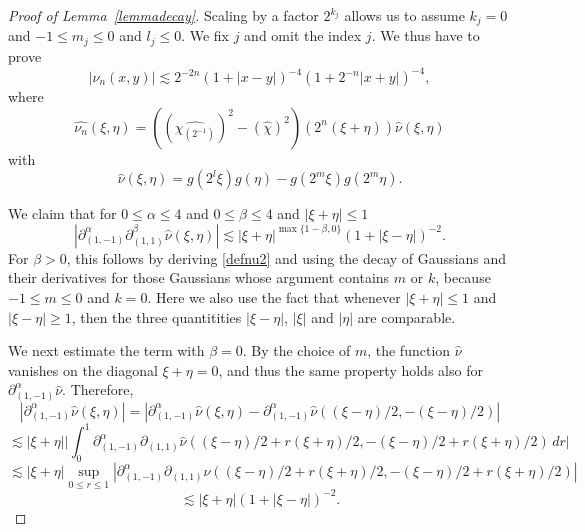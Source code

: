 \documentclass[12pt,reqno]{amsart}
\theoremstyle{plain}
\theoremstyle{definition}
\numberwithin{equation}{section}
\begin{document}
\begin{proof}[Proof of Lemma~\ref{lemmadecay}]
Scaling by a factor $2^{k_j}$ allows us to assume
$k_j=0$ and  $-1\le m_j\le 0$ and $l_j\le 0$.
We fix $j$ and omit the index $j$.   We thus have to prove
\begin{equation}\label{toprovenun2}
|\nu_{n}(x,y)|\lesssim 2^{-2n} (1+|x-y|)^{-4}(1+2^{-n} |x+y|)^{-4}, 
\end{equation}
where
\begin{equation}\label{defnun2}
\widehat{\nu_{n}}(\xi,\eta)=
((\widehat{\chi_{( 2^{-1})}})^2-(\widehat{\chi})^2)(2^{n}(\xi+\eta))\widehat{\nu}(\xi,\eta)
\end{equation}
with
\begin{equation}\label{defnu2}
\widehat{\nu}(\xi,\eta)= g(2^l\xi) g(\eta)- g(2^{m}\xi)g(2^{m}\eta).
\end{equation}

We claim that for $0\le \alpha\le 4$ and $0\le \beta\le 4$ 
and $|\xi+\eta|\le 1$
 \[|\partial_{(1,-1)}^\alpha \partial_{(1,1)}^\beta \widehat{\nu}(\xi,\eta)|
 \lesssim |\xi+\eta|^{\max\{1-\beta,0\}} (1+|\xi-\eta|)^{-2}.\]
For $\beta>0$, this follows by deriving \eqref{defnu2} 
and using the decay of Gaussians and their derivatives
for those Gaussians whose argument contains $m$ or $k$,
because $-1\le m\le 0$ and $k=0$. Here we also use the fact that whenever $|\xi+\eta|\leq 1$ and $|\xi-\eta|\geq 1$, then the three quantitities $|\xi-\eta|$, $|\xi|$ and $|\eta|$ are comparable.

We next estimate the term with $\beta=0$. By the choice of $m$, the function $\widehat{\nu}$ vanishes on the diagonal $\xi+\eta=0$, and thus the same property holds also for $\partial_{(1,-1)}^\alpha \widehat{\nu}$. Therefore,
\[|\partial_{(1,-1)}^\alpha \widehat{\nu}(\xi,\eta)|
= |\partial_{(1,-1)}^\alpha \widehat{\nu}(\xi,\eta)
-\partial_{(1,-1)}^\alpha \widehat{\nu}((\xi-\eta)/2,-(\xi-\eta)/2)|\]
\[\lesssim |\xi+\eta| \big|\int_{0}^1 \partial_{(1,-1)}^\alpha \partial_{(1,1)} \widehat{\nu}((\xi-\eta)/2+r(\xi+\eta)/2,
-(\xi-\eta)/2+r(\xi+\eta)/2)\,dr\big|\]
\[
\lesssim |\xi+\eta|\sup_{0\le r\le 1}
| \partial_{(1,-1)}^\alpha \partial_{(1,1)} \widehat{\nu}((\xi-\eta)/2+r(\xi+\eta)/2,
-(\xi-\eta)/2+r(\xi+\eta)/2)|
\]
\[\lesssim |\xi+\eta| (1+|\xi-\eta|)^{-2}.\]


\end{proof}
\end{document}
